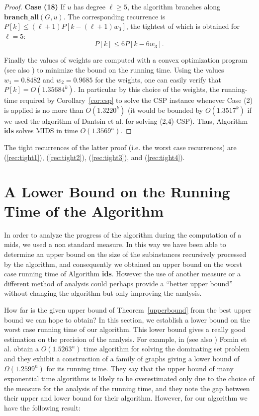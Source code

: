 \documentclass[a4paper,10pt]{article}
\theoremstyle{plain}
\theoremstyle{definition}
\theoremstyle{remark}
\newcommand{\MIDSpb}{\textsc{MIDS}\xspace}
\newcommand{\mids}{mids\xspace}
\newcommand{\CSPpb}{\textsc{CSP}\xspace}
\newcommand{\brancha}{\mathbf{branch\_all}}
\newcommand{\runtime}{1.3569}
\newcommand{\runtimeprec}{1.35684}
\begin{document}
\begin{proof}
{\bf Case (18)}
If $u$ has degree $\ell \ge 5$, the algorithm branches along $\brancha(G,u)$. The corresponding recurrence is $P[k] \leq (\ell+1) P[k-(\ell+1)w_3]$, the tightest of which is
obtained for $\ell=5$:
\begin{equation}
P[k] \leq 6P[k-6w_3].
\end{equation}

Finally the values of weights are computed with a convex optimization program \cite{GaspersS09} (see also \cite{Gaspers08})
to minimize the bound on the running time.
Using the values $w_1=0.8482$ and $w_2=0.9685$ for the weights, one can
easily verify that $P[k]=O(\runtimeprec^k)$. In particular by this choice of the weights, the running-time required
by Corollary~\ref{cor:csp} to solve the \CSPpb instance whenever Case (2) is applied is no more than $O(1.3220^k)$
(it would be bounded by $O(1.3517^k)$ if we used the algorithm of Dantsin et al. \cite{Dantsin} for solving (2,4)-\CSPpb).
Thus, Algorithm \textbf{ids} solves \MIDSpb in time $O(\runtime^n)$.
\end{proof}

The tight recurrences of the latter proof (i.e. the worst case
recurrences) are (\ref{rec:tight1}), (\ref{rec:tight2}), (\ref{rec:tight3}), and (\ref{rec:tight4}).



\section{A Lower Bound on the Running Time of the Algorithm}
In order to analyze the progress of the algorithm during the computation of a
\mids, we used a non standard measure. In this way we have been able to
determine an upper bound on the size of the subinstances recursively processed by the
algorithm, and consequently we obtained an upper bound on the
worst case running time of Algorithm \textbf{ids}. However the use of another measure
or a different method of analysis could perhaps provide a
``better upper bound'' without changing the algorithm but only improving the
analysis.

How far is the given upper bound of Theorem~\ref{upperbound} from the best upper
bound we can hope to obtain?
In this section, we establish a lower bound on the worst case running time of
our algorithm. This lower bound gives a really good estimation on the precision of
the analysis. For example, in \cite{icalp2005} (see also \cite{AcmFGK}) Fomin et al. obtain a
$O(1.5263^n)$ time algorithm for solving the dominating set problem and
they exhibit a construction of a family of graphs giving a lower bound of $\Omega(1.2599^n)$
for its running time. They say that the upper bound of many exponential time
algorithms is likely to be overestimated only due to the choice of the measure
for the analysis of the running time, and they note the gap between their upper
and lower bound for their algorithm.
However, for our algorithm we have the following result:
\end{document}
